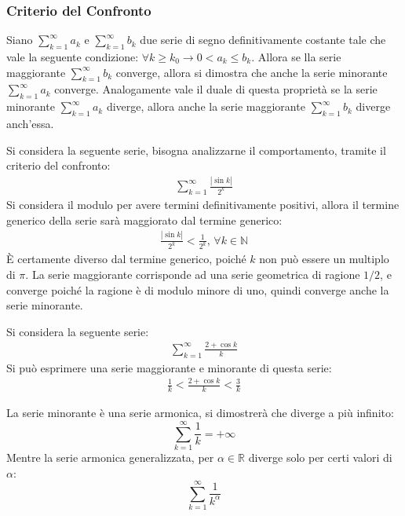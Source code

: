 \documentclass{article}
\numberwithin{equation}{subsection}
\begin{document}
\subsubsection{Criterio del Confronto}

Siano $\sum_{k=1}^\infty a_k$ e $\sum_{k=1}^\infty b_k$ due serie di segno definitivamente costante tale che vale la seguente condizione: $\forall k\geq k_0\rightarrow 0<a_k\leq b_k$. Allora se lla serie maggiorante $\sum_{k=1}^\infty b_k$ converge, allora si dimostra che anche la serie minorante $\sum_{k=1}^\infty a_k$ converge. Analogamente vale il duale di questa proprietà se la serie minorante $\sum_{k=1}^\infty a_k$ diverge, allora anche la serie maggiorante $\sum_{k=1}^\infty b_k$ diverge anch'essa. 


Si considera la seguente serie, bisogna analizzarne il comportamento, tramite il criterio del confronto:
\begin{gather*}
    \displaystyle\sum_{k=1}^\infty\frac{|\sin k|}{2^k}
\end{gather*}
Si considera il modulo per avere termini definitivamente positivi, allora il termine generico della serie sarà maggiorato dal termine generico:
\begin{gather*}
    \displaystyle\frac{|\sin k|}{2^k}<\frac{1}{2^k},\,\forall k\in\mathbb{N}
\end{gather*}
È certamente diverso dal termine generico, poiché $k$ non può essere un multiplo di $\pi$. 
La serie maggiorante corrisponde ad una serie geometrica di ragione $1/2$, e converge poiché la ragione è di modulo minore di uno, quindi converge anche la serie minorante. 

Si considera la seguente serie:
\begin{gather*}
    \displaystyle\sum_{k=1}^\infty\frac{2+\cos k}{k}
\end{gather*}
Si può esprimere una serie maggiorante e minorante di questa serie:
\begin{gather*}
    \displaystyle\frac{1}{k}<\frac{2+\cos k}{k}<\frac{3}{k}
\end{gather*}

La serie minorante è una serie armonica, si dimostrerà che diverge a più infinito:
\begin{equation*}
    \displaystyle\sum_{k=1}^\infty\frac{1}{k}=+\infty
\end{equation*}
Mentre la serie armonica generalizzata, per $\alpha\in\mathbb{R}$ diverge solo per certi valori di $\alpha$:
\begin{equation*}
    \displaystyle\sum_{k=1}^\infty\frac{1}{k^\alpha}
\end{equation*}
\end{document}

